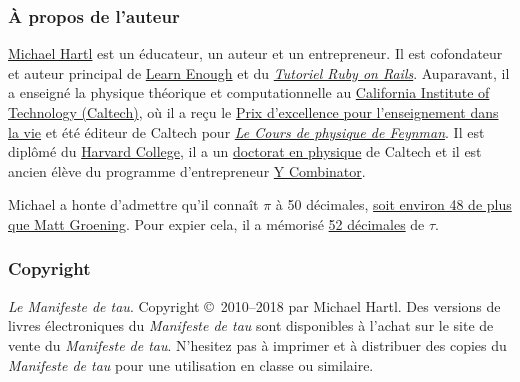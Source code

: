     \subsubsection{À propos de l'auteur} %
    \label{sec:about_the_author}


\href{https://www.michaelhartl.com/}{Michael Hartl} est un éducateur, un auteur et un entrepreneur. Il est cofondateur et auteur principal de \href{https://www.learnenough.com/}{Learn Enough} et du \href{https://www.railstutorial.org/}{\emph{Tutoriel Ruby on Rails}}. Auparavant, il a enseigné la physique théorique et computationnelle au \href{https://www.caltech.edu/}{California Institute of Technology (Caltech)}, où il a reçu le \href{https://www.michaelhartl.com/ascit/awards2000.html}{Prix d'excellence pour l'enseignement dans la vie} et été éditeur de Caltech pour \href{https://www.feynmanlectures.caltech.edu/}{\emph{Le Cours de physique de Feynman}}. Il est diplômé du \href{https://college.harvard.edu/}{Harvard College}, il a un \href{https://thesis.library.caltech.edu/1940/}{doctorat en physique} de Caltech et il est ancien élève du programme d'entrepreneur \href{https://ycombinator.com/}{Y Combinator}.

Michael a honte d'admettre qu'il connaît $\pi$ à 50 décimales, \href{\#fig-futurama_video}{soit environ 48 de plus que Matt Groening}. Pour expier cela, il a mémorisé \href{https://www.wolframalpha.com/input/?i=N[2+Pi,+53]}{52 décimales} de $\tau$.

    \subsubsection{Copyright} %
    \label{sec:copyright_and_license}

    \emph{Le Manifeste de tau}. Copyright \copyright\ 2010--2018 par Michael Hartl. Des versions de livres électroniques du \emph{Manifeste de tau} sont disponibles à l'achat sur le site de vente du \emph{Manifeste de tau}. N'hesitez pas à imprimer et à distribuer des copies du \emph{Manifeste de tau} pour une utilisation en classe ou similaire.

